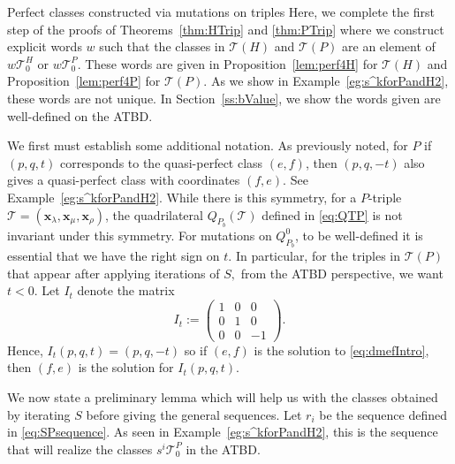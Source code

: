\documentclass[11pt, reqno]{amsart}
\makeatletter
\def\subsection{\@startsection{subsection}{2}%
  \z@{.5\linespacing\@plus.7\linespacing}{-.5em}%
  {\normalfont\large\bfseries}}
\theoremstyle{remark}
\numberwithin{equation}{subsection}
\numberwithin{figure}{section}
\theoremstyle{customremark}
\newcommand{\Tt}{\mathcal{T}}
\newcommand{\la}{{\lambda}}
\newcommand{\T}{\mathcal{T}}
\makeatother
\begin{document}
\subsection{Perfect classes constructed via mutations on triples} \label{ss:findPerfect}
Here, we complete the first step of the proofs of Theorems~\ref{thm:HTrip} and \ref{thm:PTrip} where we construct explicit words $w$ such that the classes in $\T(H)$ and $\T(P)$ are an element of $w\Tt_0^H$ or $w\Tt_0^P$. These words are given in Proposition~\ref{lem:perf4H} for $\Tt(H)$ and Proposition~\ref{lem:perf4P} for $\Tt(P).$ As we show in Example~\ref{eg:s^kforPandH2}, these words are not unique. In Section~\ref{ss:bValue}, we show the words given are well-defined on the ATBD. 



We first must establish some additional notation. As previously noted, for $P$ if $(p,q,t)$ corresponds to the quasi-perfect class $(e,f)$, then $(p,q,-t)$ also gives a quasi-perfect class with coordinates $(f,e).$ See Example~\ref{eg:s^kforPandH2}. While there is this symmetry, for a $P$-triple $\Tt=(\bm{x}_\la,\bm{x}_\mu,\bm{x}_\rho)$, the quadrilateral $Q_{P_b}(\Tt)$ defined in \eqref{eq:QTP} is not invariant under this symmetry. For mutations on $Q_{P_b}^0$, to be well-defined it is essential that we have the right sign on $t.$  In particular, for the triples in $\Tt(P)$ that appear after applying iterations of $S,$ from the ATBD perspective, we want $t<0.$ Let $I_t$ denote the matrix \[I_t:=\begin{pmatrix} 1&0&0 \\ 0&1&0\\ 0&0&-1 \end{pmatrix}.\] 
Hence, $I_t(p,q,t)=(p,q,-t)$ so if $(e,f)$ is the solution to \eqref{eq:dmefIntro}, then $(f,e)$ is the solution for $I_t(p,q,t).$



 We now state a preliminary lemma which will help us with the classes obtained by iterating $S$ before giving the general sequences. Let $r_{i}$ be the sequence defined in \eqref{eq:SPsequence}. As seen in Example~\ref{eg:s^kforPandH2}, this is the sequence that will realize the classes $s^i\Tt_0^P$ in the ATBD. 
 
\end{document}
